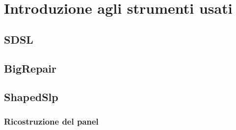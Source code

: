 \section{Introduzione agli strumenti usati}
\subsection{SDSL}
\subsection{BigRepair}
\subsection{ShapedSlp}
\subsubsection{Ricostruzione del panel}